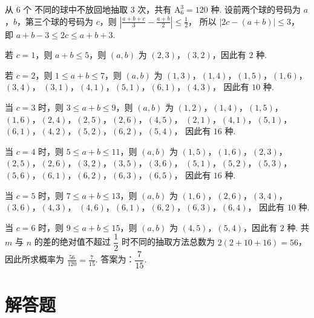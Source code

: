 \begin{solution}
从 \( 6\text{ 个} \) 不同的球中不放回地抽取 \( 3\text{ 次} \)，共有
\(\mathrm A_6^3=120\text{ 种}\).
设前两个球的号码为 \(a\)，\(b\)，第三个球的号码为 \( c \)，则
\(\left| \frac{a+b+c}{3}-\frac{a+b}{2} \right|\le \frac{1}{2}\)，
所以
\(\left| 2c-(a+b) \right|\le 3\)，
即
\(a+b-3\le 2c\le a+b+3\).

若 \( c=1 \)，则 \( a+b\le 5 \)，则 \( (a,b) \) 为 \((2,3)\)，\((3,2)\)，因此有 \(2\text{ 种}\).

若 \( c=2 \)，则 \( 1\le a+b\le 7 \)，则 \( (a,b) \) 为
\((1,3)\)，\((1,4)\)，\((1,5)\)，\((1,6)\)，\((3,4)\)，
\((3,1)\)，\((4,1)\)，\((5,1)\)，\((6,1)\)，\((4,3)\)，
因此有 \(10\text{ 种}\).

当 \( c=3 \) 时，则 \( 3\le a+b\le 9 \)，则 \( (a,b) \) 为
\((1,2)\)，\((1,4)\)，\((1,5)\)，\((1,6)\)，\((2,4)\)，\((2,5)\)，\((2,6)\)，\((4,5)\)，
\((2,1)\)，\((4,1)\)，\((5,1)\)，\((6,1)\)，\((4,2)\)，\((5,2)\)，\((6,2)\)，\((5,4)\)，
因此有 \(16\text{ 种}\).

当 \( c=4 \) 时，则 \( 5\le a+b\le 11 \)，则 \( (a,b) \) 为
\((1,5)\)，\((1,6)\)，\((2,3)\)，\((2,5)\)，\((2,6)\)，\((3,2)\)，\((3,5)\)，\((3,6)\)，
\((5,1)\)，\((5,2)\)，\((5,3)\)，\((5,6)\)，\((6,1)\)，\((6,2)\)，\((6,3)\)，\((6,5)\)，
因此有 \(16\text{ 种}\).

当 \( c=5 \) 时，则 \( 7\le a+b\le 13 \)，则 \( (a,b) \) 为
\((1,6)\)，\((2,6)\)，\((3,4)\)，\((3,6)\)，\((4,3)\)，
\((4,6)\)，\((6,1)\)，\((6,2)\)，\((6,3)\)，\((6,4)\)，
因此有 \(10\text{ 种}\).

当 \( c=6 \) 时，则 \( 9\le a+b\le 15 \)，则 \( (a,b) \) 为 \((4,5)\)，\((5,4)\)，因此有 \(2\text{ 种}\).
共 \( m \) 与 \( n \) 的差的绝对值不超过 \( \dfrac{1}{2} \) 时不同的抽取方法总数为
\(2(2+10+16)=56\)，
因此所求概率为
\(\frac{56}{120}=\frac{7}{15}\).
答案为：\( \dfrac{7}{15} \).
\end{solution}
\section{解答题}

